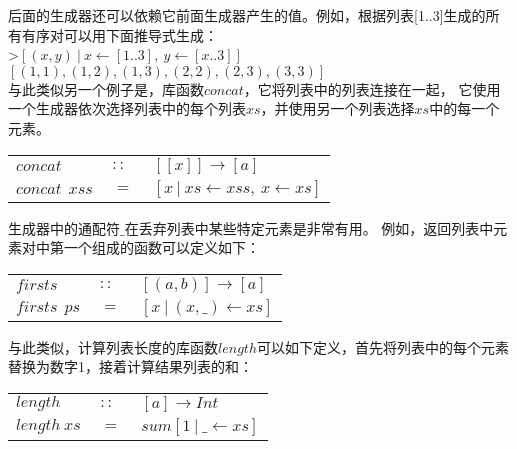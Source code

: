 后面的生成器还可以依赖它前面生成器产生的值。例如，根据列表[1..3]生成的所有有序对可以用下面推导式生成：\\

\noindent\hspace*{1cm}>$[(x,y)~|~x\leftarrow [1..3],~y\leftarrow [x..3]]$\\
\hspace*{1cm}$[(1,1),(1,2),(1,3),(2,2),(2,3),(3,3)]$\\

与此类似另一个例子是，库函数$concat$，它将列表中的列表连接在一起， 它使用一个生成器依次选择列表中的每个列表$xs$，并使用另一个列表选择$xs$中的每一个元素。\\

\begin{tabular}[t]{lll}
  $concat$&$~::~$&$[[x]]\rightarrow [a]$\\
  $concat~~xss$&$~=~$&$[x~|~xs \leftarrow xss,~x\leftarrow xs]$
\end{tabular}




生成器中的通配符$\_$在丢弃列表中某些特定元素是非常有用。 例如，返回列表中元素对中第一个组成的函数可以定义如下：

\begin{tabular}[t]{lll}
  $firsts$&$~::~$&$[(a,b)] \rightarrow [a]$\\
  $firsts~~ps$&$~=~$&$[x~|~(x,\_ ) \leftarrow xs]$\\
\end{tabular}

\noindent 与此类似，计算列表长度的库函数$length$可以如下定义，首先将列表中的每个元素替换为数字1，接着计算结果列表的和：

\begin{tabular}[t]{lll}
$length$&$~::~$&$[a]\rightarrow Int$\\
$length~xs$&$~=~$&$sum[1~|~\_ \leftarrow xs]$\\  
\end{tabular}\\

